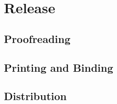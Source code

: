 \documentclass[
  a5paper,10pt,           %
  dvipsnames              %
]{book}
\begin{document}
\chapter{Release}
\section{Proofreading}
\section{Printing and Binding}
\section{Distribution}
\backmatter

\printbibliography[heading=bibintoc]

\printacronyms[heading=none]

\cleardoublepage
\def\index#1{} %
\printindex    %
\end{document}
